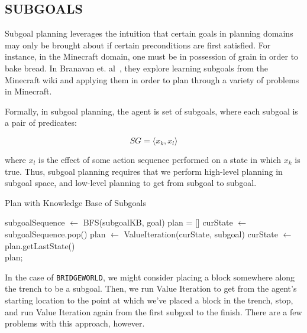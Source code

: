\documentclass[]{article}
\begin{document}
\subsection{SUBGOALS}
Subgoal planning leverages the intuition that certain goals in planning domains may only be brought about if certain preconditions are first satisfied. For instance, in the Minecraft domain, one must be in possession of grain in order to bake bread. In Branavan et. al~\citep{branavan}, they explore learning subgoals from the Minecraft wiki and applying them in order to plan through a variety of problems in Minecraft.

Formally, in subgoal planning, the agent is set of subgoals, where each subgoal is a pair of predicates:

\[ 
SG = \langle x_k, x_l \rangle
\]

where $x_l$ is the effect of some action sequence performed on a state in which $x_k$ is true. Thus, subgoal planning requires that we perform high-level planning in subgoal space, and low-level planning to get from subgoal to subgoal.


\begin{algorithm}
  \caption{Plan with Knowledge Base of Subgoals}
  \begin{algorithmic}[1]
    \State subgoalSequence $\gets$ BFS(subgoalKB, goal)
    \State plan = []
    \State curState $\gets$ subgoalSequence.pop()
    		\State plan $\gets$ ValueIteration(curState, subgoal)
		\State curState $\gets$ plan.getLastState()
    \EndFor \\
    \Return plan;
  \end{algorithmic}
\end{algorithm}

In the case of \texttt{BRIDGEWORLD}, we might consider placing a block somewhere along the trench to be a subgoal. Then, we run Value Iteration to get from the agent's starting location to the point at which we've placed a block in the trench, stop, and run Value Iteration again from the first subgoal to the finish. There are a few problems with this approach, however.

\end{document}
